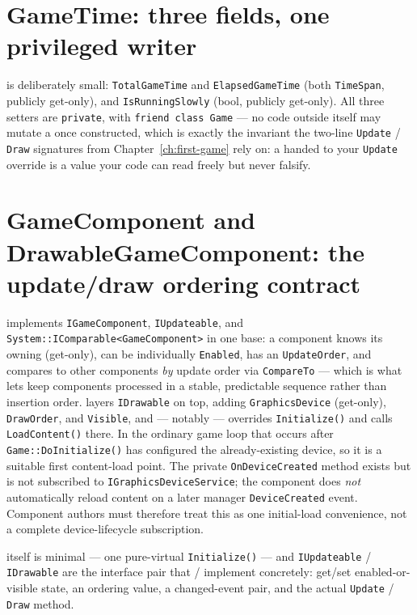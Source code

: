 \section{GameTime: three fields, one privileged writer}

 is deliberately small: \texttt{TotalGameTime} and
\texttt{ElapsedGameTime} (both \texttt{TimeSpan}, publicly get-only), and
\texttt{IsRunningSlowly} (bool, publicly get-only). All three setters are \texttt{private},
with \texttt{friend class Game} --- no code outside  itself may mutate a
 once constructed, which is exactly the invariant the two-line
\texttt{Update} / \texttt{Draw} signatures from Chapter~\ref{ch:first-game} rely on: a
 handed to your \texttt{Update} override is a value your code can read
freely but never falsify.

\section[GameComponent and DrawableGameComponent: the ordering contract]{GameComponent and DrawableGameComponent: the update/draw ordering contract}

 implements \texttt{IGameComponent}, \texttt{IUpdateable}, and
\texttt{System::IComparable<GameComponent>} in one base: a component knows its owning
 (get-only), can be individually \texttt{Enabled}, has an
\texttt{UpdateOrder}, and compares to other components \emph{by} update order via
\texttt{CompareTo} --- which is what lets  keep components
processed in a stable, predictable sequence rather than insertion order.
 layers \texttt{IDrawable} on top, adding
\texttt{GraphicsDevice} (get-only), \texttt{DrawOrder}, and \texttt{Visible}, and --- notably
--- overrides \texttt{Initialize()} and calls \texttt{LoadContent()} there. In the ordinary
game loop that occurs after \texttt{Game::DoInitialize()} has configured the already-existing
device, so it is a suitable first content-load point. The private \texttt{OnDeviceCreated}
method exists but is not subscribed to \texttt{IGraphicsDeviceService}; the component does
\emph{not} automatically reload content on a later manager \texttt{DeviceCreated} event.
Component authors must therefore treat this as one initial-load convenience, not a complete
device-lifecycle subscription.

 itself is minimal --- one pure-virtual \texttt{Initialize()} ---
and \texttt{IUpdateable} / \texttt{IDrawable} are the interface pair that
 /  implement concretely: get/set
enabled-or-visible state, an ordering value, a changed-event pair, and the actual
\texttt{Update} / \texttt{Draw} method.

